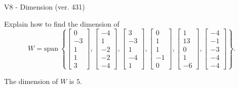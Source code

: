 \begin{exercise}
  \begin{exerciseTitle}V8 - Dimension (ver. 431)\end{exerciseTitle}
  \begin{exerciseStatement}
    Explain how to find the dimension of 
\[W=\mathrm{span}\ \left\{\left[\begin{array}{r}
0 \\
-3 \\
1 \\
1 \\
3
\end{array}\right] , \left[\begin{array}{r}
-4 \\
1 \\
-2 \\
-2 \\
-4
\end{array}\right] , \left[\begin{array}{r}
3 \\
-3 \\
1 \\
-4 \\
1
\end{array}\right] , \left[\begin{array}{r}
0 \\
1 \\
1 \\
-1 \\
0
\end{array}\right] , \left[\begin{array}{r}
1 \\
13 \\
0 \\
1 \\
-6
\end{array}\right] , \left[\begin{array}{r}
-4 \\
-1 \\
-3 \\
-4 \\
-4
\end{array}\right]\right\}.\]



  \end{exerciseStatement}
  \begin{exerciseAnswer}
   The dimension of \(W\) is  \(5\).
  


  \end{exerciseAnswer}
\end{exercise}
